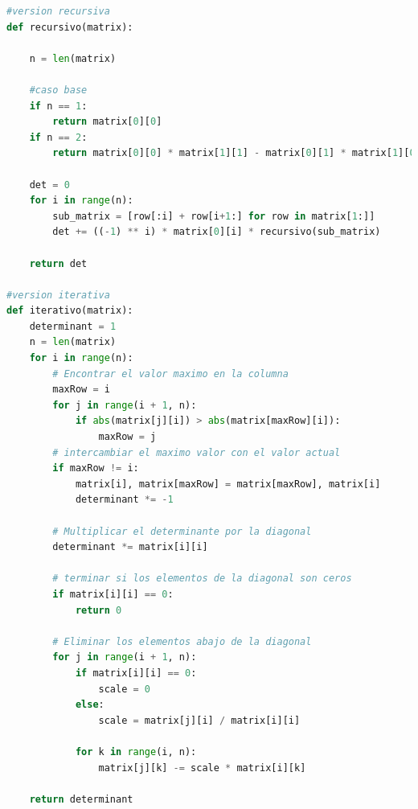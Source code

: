 \documentclass{article}
\begin{document}
\begin{file}[determinante.py]
\begin{lstlisting}[language=Python]
#version recursiva    
def recursivo(matrix):
    
    n = len(matrix)

    #caso base
    if n == 1:
        return matrix[0][0]
    if n == 2:
        return matrix[0][0] * matrix[1][1] - matrix[0][1] * matrix[1][0]

    det = 0
    for i in range(n):
        sub_matrix = [row[:i] + row[i+1:] for row in matrix[1:]] 
        det += ((-1) ** i) * matrix[0][i] * recursivo(sub_matrix)

    return det

#version iterativa
def iterativo(matrix):
    determinant = 1
    n = len(matrix)
    for i in range(n):
        # Encontrar el valor maximo en la columna
        maxRow = i
        for j in range(i + 1, n):
            if abs(matrix[j][i]) > abs(matrix[maxRow][i]):
                maxRow = j
        # intercambiar el maximo valor con el valor actual
        if maxRow != i:
            matrix[i], matrix[maxRow] = matrix[maxRow], matrix[i]
            determinant *= -1

        # Multiplicar el determinante por la diagonal
        determinant *= matrix[i][i]
        
        # terminar si los elementos de la diagonal son ceros
        if matrix[i][i] == 0:
            return 0

        # Eliminar los elementos abajo de la diagonal
        for j in range(i + 1, n):
            if matrix[i][i] == 0:
                scale = 0
            else:
                scale = matrix[j][i] / matrix[i][i]
                
            for k in range(i, n):
                matrix[j][k] -= scale * matrix[i][k]
                
    return determinant

\end{lstlisting}
\end{file}
\end{document}
